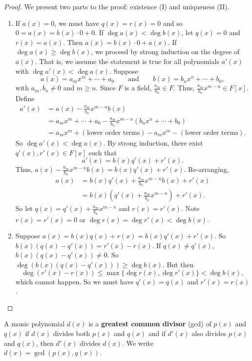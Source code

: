 \begin{proof}
	We present two parts to the proof: existence (I) and uniqueness (II).
	\begin{enumerate}[label=\textbf{(\Roman*)}]
		\item If $a(x)=0$, we must have $q(x)=r(x)=0$ and so $0=a(x)=b(x)\cdot 0+0$. If $\deg a(x)<\deg b(x)$, let $q(x)=0$ and $r(x)=a(x)$. Then $a(x)=b(x)\cdot 0+a(x)$. If $\deg a(x)\geq \deg b(x)$, we proceed by strong induction on the degree of $a(x)$. That is, we assume the statement is true for all polynomials $a'(x)$ with $\deg a'(x)<\deg a(x)$. Suppose
		$$a(x)=a_mx^m+\cdots+a_0\qquad\text{and}\qquad b(x)=b_nx^n+\cdots+b_0,$$
		with $a_m,b_n\neq 0$ and $m\geq n$. Since $F$ is a field, $\frac{a_m}{b_n}\in F$. Thus, $\frac{a_m}{b_n}x^{m-n}\in F[x]$. Define
		\begin{align*}
			a'(x)&=a(x)-\frac{a_m}{b_n}x^{m-n}b(x)\\
			&=a_mx^m+\cdots+a_0-\frac{a_m}{b_n}x^{m-n}(b_nx^n+\cdots+b_0)\\
			&=a_mx^m+(\text{lower order terms})-a_mx^m-(\text{lower order terms}).
		\end{align*}
		So $\deg a'(x)<\deg a(x)$. By strong induction, there exist $q'(x),r'(x)\in F[x]$ such that
		$$a'(x)=b(x)q'(x)+r'(x).$$
		Thus, $a(x)-\frac{a_m}{b_n}x^{m-n}b(x)=b(x)q'(x)+r'(x)$. Re-arranging,
		\begin{align*}
			a(x)&=b(x)q'(x)+\frac{a_m}{b_n}x^{m-n}b(x)+r'(x)\\
			&=b(x)\left(q'(x)+\frac{a_m}{b_n}x^{m-n}\right)+r'(x).
		\end{align*}
		So let $q(x)=q'(x)+\frac{a_m}{b_n}x^{m-n}$ and $r(x)=r'(x)$. Note $r(x)=r'(x)=0$ or $\deg r(x)=\deg r'(x)<\deg b(x)$.
		\item Suppose $a(x)=b(x)q(x)+r(x)=b(x)q'(x)+r'(x)$. So $b(x)(q(x)-q'(x))=r'(x)-r(x)$. If $q(x)\neq q'(x)$, $b(x)(q(x)-q'(x))\neq 0$. So $\deg(b(x)(q(x)-q'(x)))\geq\deg b(x)$. But then
		$$\deg(r'(x)-r(x))\leq\max\{\deg r(x),\deg r'(x)\}<\deg b(x),$$
		which cannot happen. So we must have $q'(x)=q(x)$ and $r'(x)=r(x)$.
	\end{enumerate}
\end{proof}

\begin{definition}
	A monic polynomial $d(x)$ is a \textbf{greatest common divisor} (gcd) of $p(x)$ and $q(x)$ if $d(x)$ divides both $p(x)$ and $q(x)$ and if $d'(x)$ also divides $p(x)$ and $q(x)$, then $d'(x)$ divides $d(x)$. We write $d(x)=\gcd(p(x),q(x))$.
\end{definition}


